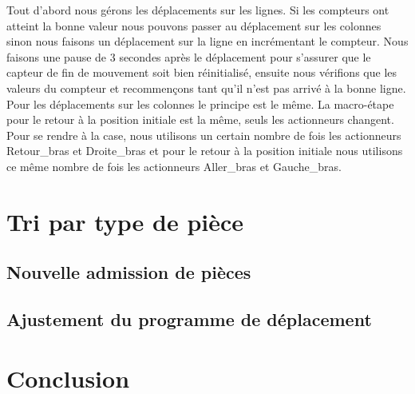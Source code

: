\documentclass[oneside,a4paper,12pt]{article}
\begin{document}
			Tout d’abord nous gérons les déplacements sur les lignes. Si les compteurs ont atteint la bonne valeur nous pouvons passer au déplacement sur les colonnes sinon nous faisons un déplacement sur la ligne en incrémentant le compteur. Nous faisons une pause de 3 secondes après le déplacement pour s’assurer que le capteur de fin de mouvement soit bien réinitialisé, ensuite nous vérifions que les valeurs du compteur et recommençons tant qu’il n’est pas arrivé à la bonne ligne. Pour les déplacements sur les colonnes le principe est le même. La macro-étape pour le retour à la position initiale est la même, seuls les actionneurs changent. Pour se rendre à la case, nous utilisons un certain nombre de fois les actionneurs Retour\_bras et Droite\_bras et pour le retour à la position initiale nous utilisons ce même nombre de fois les actionneurs Aller\_bras et Gauche\_bras.

	\section{Tri par type de pièce}
		\subsection{Nouvelle admission de pièces}
		
		\subsection{Ajustement du programme de déplacement}
	
	\section{Conclusion}
	
\end{document}
